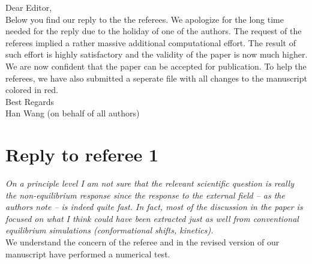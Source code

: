 \documentclass[]{revtex4-1}
\begin{document}
Dear Editor,\\

Below you find our reply to the the referees. We apologize for the long time needed for the reply due to the holiday of one of the authors.
The request of the referees implied a rather massive additional computational effort.
The result of such effort is highly satisfactory and the validity of the paper is now much higher.
We are now confident that the paper can be accepted for publication.
To help the referees, we have also submitted a seperate file with all changes to the manuscript colored in red.
\\

Best Regards\\


Han Wang (on behalf of all authors) 
\section*{Reply to referee 1}

\emph{On a principle level I am not sure that the relevant scientific
  question is really the non-equilibrium response since the response
  to the external field -- as the authors note -- is indeed quite
  fast. In fact, most of the discussion in the paper is focused on
  what I think could have been extracted just as well from
  conventional equilibrium simulations (conformational shifts,
  kinetics).}\\

We understand the concern of the referee and in the revised version of our manuscript have performed a numerical test.
\end{document}
